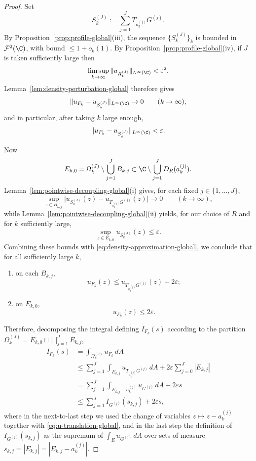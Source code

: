 \begin{proof}
Set
\[
S_k^{(J)}:=\sum_{j=1}^J T_{a_k^{(j)}}G^{(j)}.
\]
By Proposition~\ref{prop:profile-global}(iii), the sequence
\(\{S_k^{(J)}\}_k\) is bounded in \(\mathcal F^2(\C)\), with bound
\(\le 1+o_k(1)\). By Proposition~\ref{prop:profile-global}(iv), if \(J\) is
taken sufficiently large then
\[
\limsup_{k\to\infty}\|u_{R_k^{(J)}}\|_{L^\infty(\C)}<\varepsilon^2.
\]
Lemma~\ref{lem:density-perturbation-global} therefore gives
\[
\|u_{F_k}-u_{S_k^{(J)}}\|_{L^\infty(\C)}\to 0
\qquad (k\to\infty),
\]
and in particular, after taking \(k\) large enough,
\begin{equation}\label{eq:density-approximation-global}
\|u_{F_k}-u_{S_k^{(J)}}\|_{L^\infty(\C)}<\varepsilon.
\end{equation}

Now
\[
E_{k,0}
=
\Omega_k^{(J)}\setminus \bigcup_{j=1}^J B_{k,j}
\subset
\C\setminus \bigcup_{j=1}^J D_R(a_k^{(j)}).
\]
Lemma~\ref{lem:pointwise-decoupling-global}(i) gives, for each fixed
\(j\in\{1,\dots,J\}\),
\[
\sup_{z\in B_{k,j}}
\big|u_{S_k^{(J)}}(z)-u_{T_{a_k^{(j)}}G^{(j)}}(z)\big|\to 0
\qquad (k\to\infty),
\]
while Lemma~\ref{lem:pointwise-decoupling-global}(ii) yields, for our
choice of \(R\) and for \(k\) sufficiently large,
\[
\sup_{z\in E_{k,0}}u_{S_k^{(J)}}(z)\le \varepsilon.
\]
Combining these bounds with \eqref{eq:density-approximation-global}, we
conclude that for all sufficiently large \(k\),
\begin{enumerate}
\item[(a)] on each \(B_{k,j}\),
\[
u_{F_k}(z)\le u_{T_{a_k^{(j)}}G^{(j)}}(z)+2\varepsilon;
\]
\item[(b)] on \(E_{k,0}\),
\[
u_{F_k}(z)\le 2\varepsilon.
\]
\end{enumerate}

Therefore, decomposing the integral defining \(I_{F_k}(s)\) according to the
partition \(\Omega_k^{(J)}=E_{k,0}\sqcup\bigsqcup_{j=1}^J E_{k,j}\),
\begin{align*}
I_{F_k}(s)
&=
\int_{\Omega_k^{(J)}} u_{F_k}\,dA \\
&\le
\sum_{j=1}^J \int_{E_{k,j}} u_{T_{a_k^{(j)}}G^{(j)}}\,dA
+2\varepsilon \sum_{j=0}^J |E_{k,j}| \\
&=
\sum_{j=1}^J \int_{E_{k,j}-a_k^{(j)}} u_{G^{(j)}}\,dA
+2\varepsilon s \\
&\le
\sum_{j=1}^J I_{G^{(j)}}(s_{k,j})
+2\varepsilon s,
\end{align*}
where in the next-to-last step we used the change of variables
\(z\mapsto z-a_k^{(j)}\) together with \eqref{eq:u-translation-global}, and
in the last step the definition of \(I_{G^{(j)}}(s_{k,j})\) as the supremum
of \(\int_E u_{G^{(j)}}\,dA\) over sets of measure
\(s_{k,j}=|E_{k,j}|=|E_{k,j}-a_k^{(j)}|\).


\end{proof}
